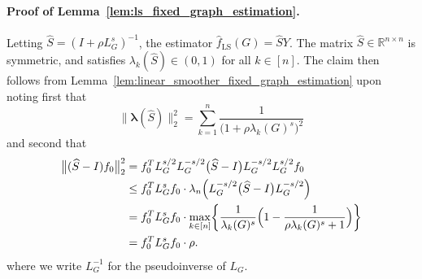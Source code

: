 \documentclass[twoside]{article}
\newcommand{\Reals}{\mathbb{R}}
\newcommand{\1}{\mathbf{1}}
\newcommand{\lambdavec}{\boldsymbol{\lambda}}
\newcommand{\Lap}{L}
\newcommand{\Id}{I}
\newcommand{\wh}[1]{\widehat{#1}}
\newcommand{\LS}{\mathrm{LS}}
\theoremstyle{definition}
\theoremstyle{remark}
\begin{document}
\paragraph{Proof of Lemma~\ref{lem:ls_fixed_graph_estimation}.}
Letting $\wh{S} = (\Id + \rho \Lap_G^s)^{-1}$, the estimator $\wh{f}_{\LS}(G) = \wh{S}Y$. The matrix $\wh{S} \in \Reals^{n \times n}$ is symmetric, and satisfies $\lambda_k(\wh{S}) \in (0,1)$ for all $k \in [n]$. The claim then follows from Lemma~\ref{lem:linear_smoother_fixed_graph_estimation} upon noting first that
\begin{equation*}
\bigl\|\lambdavec(\wh{S})\bigr\|_2^2 = \sum_{k = 1}^{n} \frac{1}{\bigl(1 + \rho \lambda_k(G)^s\bigr)^2}
\end{equation*} 
and second that
\begin{equation*}
\begin{aligned}
\bigl\|(\wh{S} - I)f_0\bigr\|_2^2 & = f_0^T \Lap_G^{s/2} \Lap_G^{-s/2}\bigl(\wh{S} - \Id\bigr) \Lap_G^{-s/2} \Lap_G^{s/2} f_0 \\
& \leq f_0^T \Lap_G^s f_0 \cdot \lambda_n\Bigl(\Lap_G^{-s/2}\bigl(\wh{S} - \Id\bigr)\Lap_G^{-s/2}\Bigr) \\
& = f_0^T \Lap_G^s f_0 \cdot \max_{k \in [n]} \biggl\{\frac{1}{\lambda_k(G)^s} \Bigl(1 - \frac{1}{\rho\lambda_k(G)^s + 1}\Bigr) \biggr\} \\
& = f_0^T \Lap_G^s f_0 \cdot \rho.
\end{aligned}
\end{equation*} 
where we write $\Lap_G^{-1}$ for the pseudoinverse of $\Lap_G$.
\end{document}
